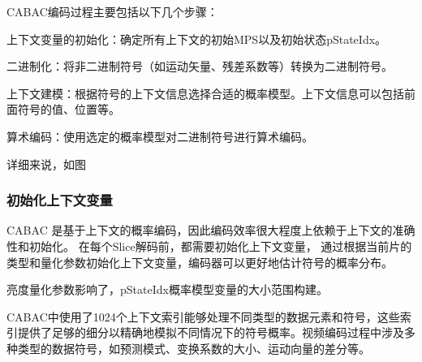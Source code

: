 \documentclass{/Users/hi/Study/template/code}
\begin{document}
CABAC编码过程主要包括以下几个步骤：
\begin{serialNumber}
	\item 上下文变量的初始化：确定所有上下文的初始MPS以及初始状态pStateIdx。
	\item 二进制化：将非二进制符号（如运动矢量、残差系数等）转换为二进制符号。
	\item 上下文建模：根据符号的上下文信息选择合适的概率模型。上下文信息可以包括前面符号的值、位置等。
	\item 算术编码：使用选定的概率模型对二进制符号进行算术编码。
\end{serialNumber}
详细来说，如图



\subsubsection{初始化上下文变量}
%
%
%

CABAC 是基于上下文的概率编码，因此编码效率很大程度上依赖于上下文的准确性和初始化。
在每个Slice解码前，都需要初始化上下文变量，
通过根据当前片的类型和量化参数初始化上下文变量，编码器可以更好地估计符号的概率分布。
\begin{remark}
	亮度量化参数影响了，pStateIdx概率模型变量的大小范围构建。
\end{remark}

CABAC中使用了1024个上下文索引能够处理不同类型的数据元素和符号，这些索引提供了足够的细分以精确地模拟不同情况下的符号概率。视频编码过程中涉及多种类型的数据符号，如预测模式、变换系数的大小、运动向量的差分等。
\end{document}
